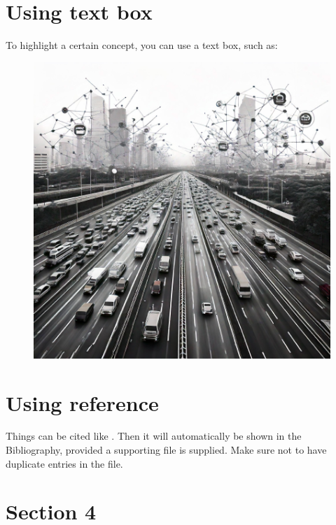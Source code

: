 \section{Using text box}
To highlight a certain concept, you can use a text box, such as:
\begin{tcolorbox}[colback=delft_blue_shade2,colframe=delft_blue_shade1,title=\textbf{Congestion}]
\begin{figure}
    \centering
    \includegraphics[width=1\linewidth]{figures/chapter_1/congestion_clip_art.pdf}
\end{figure}
\lipsum[8]
\end{tcolorbox}
\section{Using reference}
Things can be cited like \cite{panda2024aggregate}. Then it will automatically be shown in the Bibliography, provided a supporting  file is supplied. Make sure not to have duplicate entries in the file. 
\section{Section 4}
\lipsum[5]
